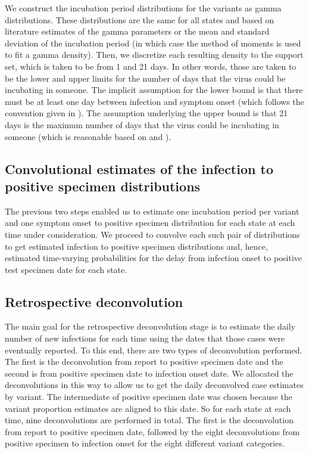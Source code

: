 \documentclass{article}
\begin{document}
We construct the incubation period distributions for the variants as gamma distributions.
These distributions are the same for all states and based on literature estimates of the gamma 
parameters or the
mean and standard deviation of the incubation period (in which case the method
of moments is used to fit a gamma density). Then, we discretize each
resulting density to the support set, which is taken to be from 1 and
21 days. In other words, those are taken to be the lower and upper limits for
the number of days that the virus could be incubating in someone. The implicit
assumption for the lower bound is that there must be at least one day between
infection and symptom onset (which follows the convention given in
\citealp{phcan2021covid}). The assumption underlying the upper bound is that 21
days is the maximum number of days that the virus could be incubating in someone
(which is reasonable based on \citealp{zaki2021estimations} and
\citealp{cortes2022sars}).

\subsection{Convolutional estimates of the infection to positive specimen distributions} 

The previous two steps enabled us to estimate one incubation period per variant
and one symptom onset to positive specimen distribution for each state at each time under
consideration. We proceed to convolve each such pair of distributions to get estimated
infection to positive specimen distributions and, hence, estimated time-varying probabilities for
the delay from infection onset to positive test specimen date for each state.

\subsection{Retrospective deconvolution}

The main goal for the retrospective deconvolution stage is to estimate the daily number of new
infections for each time using the dates that those cases were eventually
reported. To this end, there are two types of deconvolution performed. The first is the 
deconvolution from report to positive specimen date and the second is from positive specimen
 date to infection onset date. We allocated the deconvolutions in this way to allow us to get
  the daily deconvolved case estimates by variant. The intermediate of positive specimen
   date was chosen because the variant proportion estimates are aligned to this date. 
   So for each state at each time, nine deconvolutions are performed in total. 
   The first is the deconvolution from report to positive specimen date, 
   followed by the eight deconvolutions from positive specimen to infection onset for
    the eight different variant categories.
\end{document}
